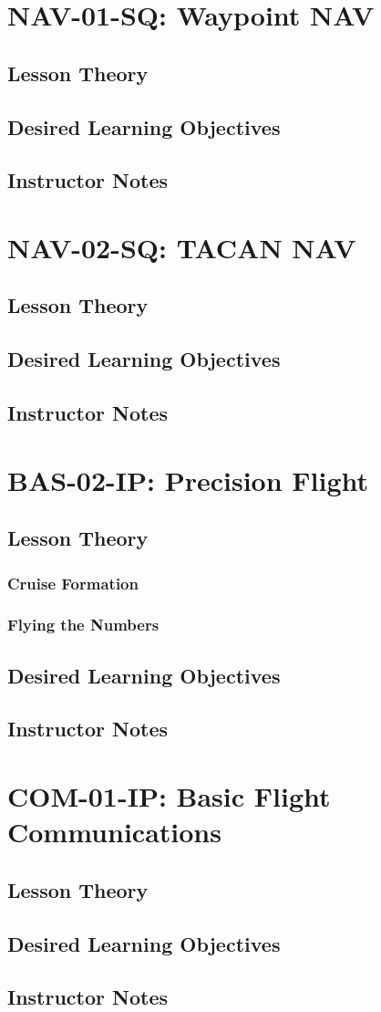   \chapter{NAV-01-SQ: Waypoint NAV}
    \section{Lesson Theory}
    \section{Desired Learning Objectives}
    \section{Instructor Notes}

  \chapter{NAV-02-SQ: TACAN NAV}
    \section{Lesson Theory}
    \section{Desired Learning Objectives}
    \section{Instructor Notes}

  \chapter{BAS-02-IP: Precision Flight}
    \section{Lesson Theory}
      \subsection{Cruise Formation}
      \subsection{Flying the Numbers}
    \section{Desired Learning Objectives}
    \section{Instructor Notes}

  \chapter{COM-01-IP: Basic Flight Communications}
    \section{Lesson Theory}
    \section{Desired Learning Objectives}
    \section{Instructor Notes}